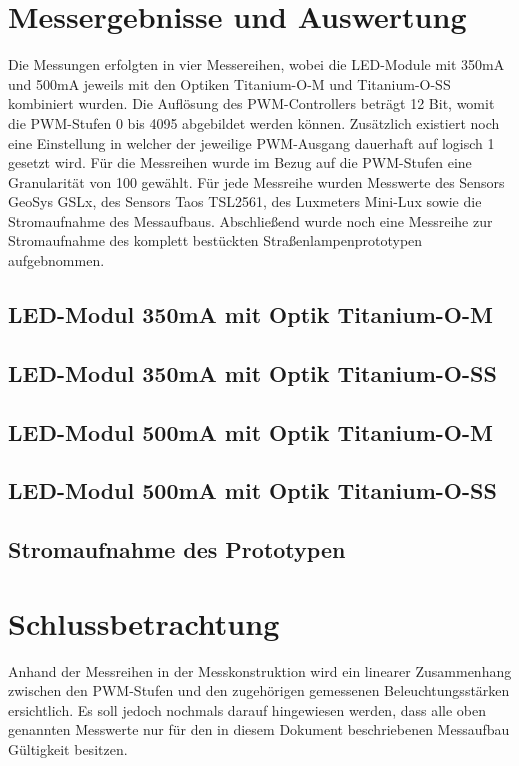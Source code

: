 \documentclass[a4paper,12pt]{scrartcl}
\begin{document}
\clearpage
\section{Messergebnisse und Auswertung}
Die Messungen erfolgten in vier Messereihen, wobei die LED-Module mit 350mA und 500mA jeweils mit den Optiken Titanium-O-M und Titanium-O-SS kombiniert wurden.
Die Auflösung des PWM-Controllers beträgt 12 Bit, womit die PWM-Stufen 0 bis 4095 abgebildet werden können. Zusätzlich existiert noch eine Einstellung in
welcher der jeweilige PWM-Ausgang dauerhaft auf logisch 1 gesetzt wird. Für die Messreihen wurde im Bezug auf die PWM-Stufen eine Granularität von 100 gewählt.
Für jede Messreihe wurden Messwerte des Sensors GeoSys GSLx, des Sensors Taos TSL2561, des Luxmeters Mini-Lux sowie die Stromaufnahme des Messaufbaus.
Abschließend wurde noch eine Messreihe zur Stromaufnahme des komplett bestückten Straßenlampenprototypen aufgebnommen.

\subsection{LED-Modul 350mA mit Optik Titanium-O-M}
\subsection{LED-Modul 350mA mit Optik Titanium-O-SS}
\subsection{LED-Modul 500mA mit Optik Titanium-O-M}
\subsection{LED-Modul 500mA mit Optik Titanium-O-SS}
\subsection{Stromaufnahme des Prototypen}

\clearpage
\section{Schlussbetrachtung}
Anhand der Messreihen in der Messkonstruktion wird ein linearer Zusammenhang zwischen den PWM-Stufen und den zugehörigen gemessenen Beleuchtungsstärken
ersichtlich. Es soll jedoch nochmals darauf hingewiesen werden, dass alle oben genannten Messwerte nur für den in diesem Dokument beschriebenen Messaufbau
Gültigkeit besitzen.
\end{document}
